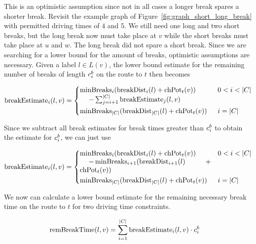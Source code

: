 This is an optimistic assumption since not in all cases a longer break spares a shorter break. Revisit the example graph of Figure~\ref{fig:graph_short_long_break} with permitted driving times of $4$ and $5$. We still need one long and two short breaks, but the long break now must take place at $v$ while the short breaks must take place at $u$ and $w$. The long break did not spare a short break. Since we are searching for a lower bound for the amount of breaks, optimistic assumptions are necessary. Given a label $l \in L(v)$, the lower bound estimate for the remaining number of breaks of length $c_i^b$ on the route to $t$ then becomes

\begin{align}\label{eq:number_breaks_sum}
	\breakEstimate_i(l,v)  =\begin{dcases}
		\parbox[t]{.55\textwidth}{$\minBreaks_i(\breakDist_i(l) + \chpotential_t(v))$ \\\phantom{{}=1}$- \sum_{j=i+1}^{|C|}{\breakEstimate_j(l,v)}$} & 0 < i < |C| \\
		\minBreaks_{|C|}(\breakDist_{|C|}(l) + \chpotential_t(v)) & i=|C|
	\end{dcases}
\end{align}

Since we subtract all break estimates for break times greater than $c_i^b$ to obtain the estimate for $c_i^b$, we can just use

\begin{align}\label{eq:break_estimate_n}
	\breakEstimate_i(l,v) = \begin{dcases}
		\parbox[t]{.55\textwidth}{$\minBreaks_i(\breakDist_i(l) + \chpotential_t(v))$ \\\phantom{{}=1}$- \minBreaks_{i+1}(\breakDist_{i+1}(l) + \chpotential_t(v))$} & 0 < i < |C| \\
		\minBreaks_{|C|}(\breakDist_{|C|}(l) + \chpotential_t(v)) & i=|C|
	\end{dcases}
\end{align}

We now can calculate a lower bound estimate for the remaining necessary break time on the route to $t$ for two driving time constraints.

\begin{align}\label{eq:rem_break_time_n}
	\begin{split}
		\operatorname{remBreakTime}(l,v) & = \sum_{i=1}^{|C|}{\operatorname{breakEstimate}_i(l,v)} \cdot c_i^b
	\end{split}
\end{align}

